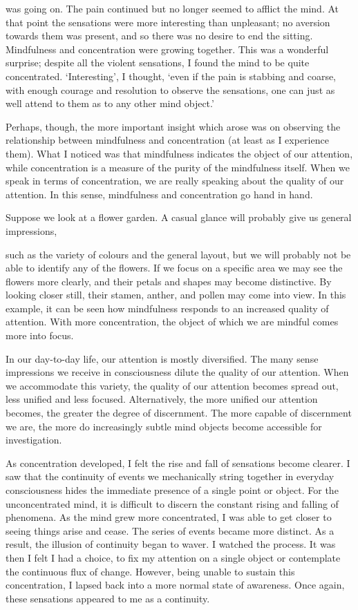 was going on. The pain continued but no longer seemed to afflict the
mind. At that point the sensations were more interesting than
unpleasant; no aversion towards them was present, and so there was no
desire to end the sitting. Mindfulness and concentration were growing
together. This was a wonderful surprise; despite all the violent
sensations, I found the mind to be quite concentrated. `Interesting', I
thought, `even if the pain is stabbing and coarse, with enough courage
and resolution to observe the sensations, one can just as well attend to
them as to any other mind object.'

Perhaps, though, the more important insight which arose was on observing
the relationship between mindfulness and concentration (at least as I
experience them). What I noticed was that mindfulness indicates the
object of our attention, while concentration is a measure of the purity
of the mindfulness itself. When we speak in terms of concentration, we
are really speaking about the quality of our attention. In this sense,
mindfulness and concentration go hand in hand.

Suppose we look at a flower garden. A casual glance will probably give
us general impressions,

such as the variety of colours and the general layout, but we will
probably not be able to identify any of the flowers. If we focus on a
specific area we may see the flowers more clearly, and their petals and
shapes may become distinctive. By looking closer still, their stamen,
anther, and pollen may come into view. In this example, it can be seen
how mindfulness responds to an increased quality of attention. With more
concentration, the object of which we are mindful comes more into focus.

In our day-to-day life, our attention is mostly diversified. The many
sense impressions we receive in consciousness dilute the quality of our
attention. When we accommodate this variety, the quality of our
attention becomes spread out, less unified and less focused.
Alternatively, the more unified our attention becomes, the greater the
degree of discernment. The more capable of discernment we are, the more
do increasingly subtle mind objects become accessible for investigation.

As concentration developed, I felt the rise and fall of sensations
become clearer. I saw that the continuity of events we mechanically
string together in everyday consciousness hides the immediate presence
of a single point or object. For the unconcentrated mind, it is
difficult to discern the constant rising and falling of phenomena. As
the mind grew more concentrated, I was able to get closer to seeing
things arise and cease. The series of events became more distinct. As a
result, the illusion of continuity began to waver. I watched the
process. It was then I felt I had a choice, to fix my attention on a
single object or contemplate the continuous flux of change. However,
being unable to sustain this concentration, I lapsed back into a more
normal state of awareness. Once again, these sensations appeared to me
as a continuity.

